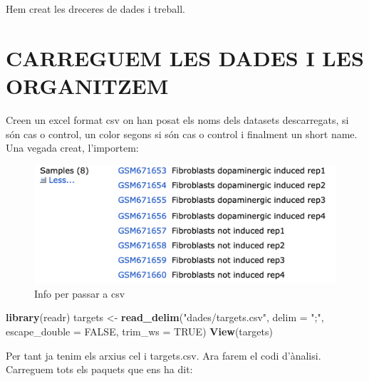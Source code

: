 \documentclass[
]{article}
\newenvironment{Shaded}{\begin{snugshade}}{\end{snugshade}}
\newcommand{\AttributeTok}[1]{\textcolor[rgb]{0.13,0.29,0.53}{#1}}
\newcommand{\ConstantTok}[1]{\textcolor[rgb]{0.56,0.35,0.01}{#1}}
\newcommand{\FunctionTok}[1]{\textcolor[rgb]{0.13,0.29,0.53}{\textbf{#1}}}
\newcommand{\NormalTok}[1]{#1}
\newcommand{\OtherTok}[1]{\textcolor[rgb]{0.56,0.35,0.01}{#1}}
\newcommand{\StringTok}[1]{\textcolor[rgb]{0.31,0.60,0.02}{#1}}
\begin{document}
Hem creat les dreceres de dades i treball.

\section{CARREGUEM LES DADES I LES
ORGANITZEM}\label{carreguem-les-dades-i-les-organitzem}

Creen un excel format csv on han posat els noms dels datasets
descarregats, si són cas o control, un color segons si són cas o control
i finalment un short name. Una vegada creat, l'importem:

\begin{figure}
\centering
\includegraphics{images/clipboard-1879416855.png}
\caption{Info per passar a csv}
\end{figure}

\begin{Shaded}
\begin{Highlighting}[]
\FunctionTok{library}\NormalTok{(readr)}
\NormalTok{targets }\OtherTok{\textless{}{-}} \FunctionTok{read\_delim}\NormalTok{(}\StringTok{"dades/targets.csv"}\NormalTok{, }\AttributeTok{delim =} \StringTok{";"}\NormalTok{, }\AttributeTok{escape\_double =} \ConstantTok{FALSE}\NormalTok{, }\AttributeTok{trim\_ws =} \ConstantTok{TRUE}\NormalTok{)}
\FunctionTok{View}\NormalTok{(targets)}
\end{Highlighting}
\end{Shaded}

Per tant ja tenim els arxius cel i targets.csv. Ara farem el codi
d'ànalisi. Carreguem tots els paquets que ens ha dit:
\end{document}

